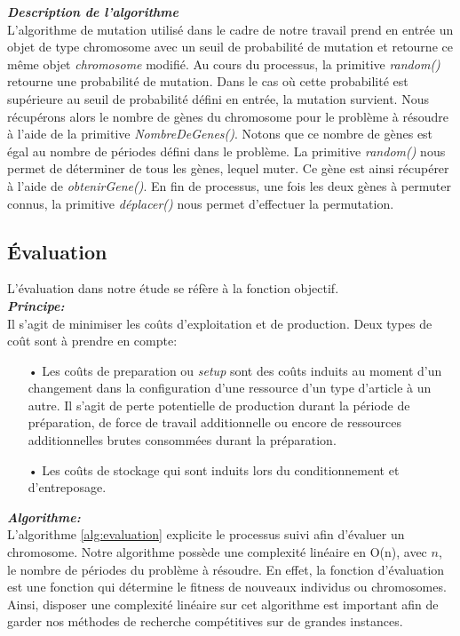 	\vspace*{.3cm}		
	\hspace*{.5cm} \textbf{\textsl{Description de l'algorithme}} \\
	\hspace*{.5cm} L'algorithme de mutation utilisé dans le cadre de notre travail prend en entrée un objet de type chromosome avec un seuil de probabilité de mutation et retourne ce même objet \emph{chromosome} modifié. Au cours du processus, la primitive \emph{random()} retourne une probabilité de mutation. Dans le cas où cette probabilité est supérieure au seuil de probabilité défini en entrée, la mutation survient. Nous récupérons alors le nombre de gènes du chromosome pour le problème à résoudre à l'aide de la primitive \emph{NombreDeGenes()}. Notons que ce nombre de gènes est égal au nombre de périodes défini dans le problème. La primitive \emph{random()} nous permet de déterminer de tous les gènes, lequel muter. Ce gène est ainsi récupérer à l'aide de \emph{obtenirGene()}. En fin de processus, une fois les deux gènes à permuter connus, la primitive \emph{déplacer()} nous permet d'effectuer la permutation.
	
	
	
	\subsection{Évaluation}
	L'évaluation dans notre étude se réfère à la fonction objectif. \\
	\hspace*{.5cm} \textbf{\textsl{Principe:}}\\	
	\hspace*{.5cm} Il s'agit de minimiser les coûts d'exploitation et de production. Deux types de coût sont à prendre en compte:
	\begin{itemize}
		\item[•] Les coûts de preparation ou \emph{setup} sont des coûts induits au moment d'un changement dans la configuration d'une ressource d'un type d'article à un autre. Il s'agit de perte potentielle de production durant la période de préparation, de force de travail additionnelle ou encore de ressources additionnelles brutes consommées durant la préparation.
		\item[•] Les coûts de stockage qui sont induits lors du conditionnement et d’entreposage.
	\end{itemize}
	
	\hspace*{.5cm} \textbf{\textsl{Algorithme:}}\\
	\hspace*{.5cm} L'algorithme \ref{alg:evaluation} explicite le processus suivi afin d'évaluer un chromosome. Notre algorithme possède une complexité linéaire en O(n), avec $n$, le nombre de périodes du problème à résoudre. En effet, la fonction d'évaluation est une fonction qui détermine le fitness de nouveaux individus ou chromosomes. Ainsi, disposer une complexité linéaire sur cet algorithme est important afin de garder nos méthodes de recherche compétitives sur de grandes instances.
	
